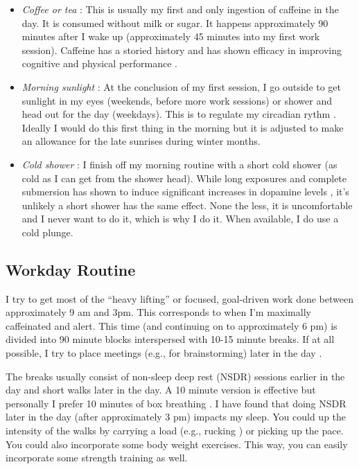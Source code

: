 \documentclass[10pt,twocolumn]{extarticle}
\begin{document}
\begin{itemize}
    \item \textit{Coffee or tea} : This is usually my first and only ingestion of caffeine in the day. It is consumed without milk or sugar. It happens approximately 90 minutes after I wake up (approximately 45 minutes into my first work session). Caffeine has a storied history \cite{weinberg2004world} and has shown efficacy in improving cognitive \cite{jarvis1993does} and physical performance \cite{jimenez2021caffeinated,hubermancaffeine}.
    \item \textit{Morning sunlight} : At the conclusion of my first session, I go outside to get sunlight in my eyes (weekends, before more work sessions) or shower and head out for the day (weekdays). This is to regulate my circadian rythm \cite{blume2019effects}. Ideally I would do this first thing in the morning but it is adjusted to make an allowance for the late sunrises during winter months. 
    \item \textit{Cold shower} : I finish off my morning routine with a short cold shower (as cold as I can get from the shower head). While long exposures and complete submersion has shown to induce significant increases in dopamine levels \cite{vsramek2000human}, it's unlikely a short shower has the same effect. None the less, it is uncomfortable and I never want to do it, which is why I do it. When available, I do use a cold plunge.
\end{itemize}

\subsection{Workday Routine}
I try to get most of the ``heavy lifting'' or focused, goal-driven work done between approximately 9 am and 3pm. This corresponds to when I'm maximally caffeinated and alert. This time (and continuing on to approximately 6 pm) is divided into 90 minute blocks interspersed with 10-15 minute breaks. If at all possible, I try to place meetings (e.g., for brainstorming) later in the day \cite{huberman2022optimizing}. 

The breaks usually consist of non-sleep deep rest (NSDR) sessions earlier in the day and short walks later in the day. A 10 minute version is effective \cite{youtube_nsdr_huberman} but personally I prefer 10 minutes of box breathing \cite{youtube_box_breathing_rockwood}. I have found that doing NSDR later in the day (after approximately 3 pm) impacts my sleep. You could up the intensity of the walks by carrying a load (e.g., rucking \cite{wikipedia}) or picking up the pace. You could also incorporate some body weight exercises. This way, you can easily incorporate some strength training as well.
\end{document}
